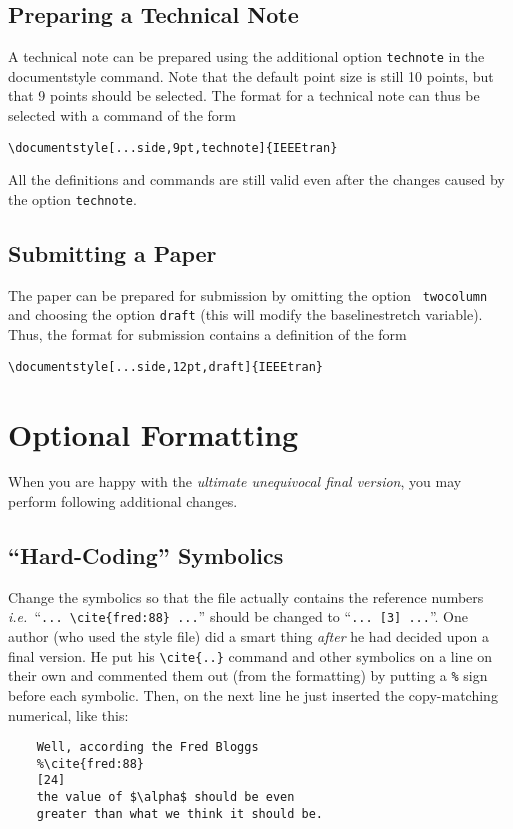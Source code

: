 \subsection{Preparing a Technical Note}
A technical note can be prepared using the additional option
\verb+technote+ in the documentstyle command. Note that the default
point size is still 10 points, but that 9 points should be selected.
The format for a technical note can thus be selected with a command
of the form
\begin{center}
\verb+\documentstyle[...side,9pt,technote]{IEEEtran}+
\end{center}
All the definitions and commands are still valid  even after the
changes caused by the option \verb+technote+.

\subsection{Submitting a Paper}
The paper can be prepared for submission by omitting the option {\tt
twocolumn} and choosing the option {\tt draft} (this will modify the
baselinestretch variable).
Thus, the format for submission contains a definition of the form
\begin{center}
\verb+\documentstyle[...side,12pt,draft]{IEEEtran}+
\end{center}

\section{Optional Formatting}

When you are happy with the {\em ultimate unequivocal final version},
you may perform following additional changes.

\subsection{``Hard-Coding'' Symbolics}
Change the symbolics so that the file actually contains the reference numbers
{\em i.e.\ \/}``\verb+... \cite{fred:88} ...+'' should be changed to
``\verb+... [3] ...+''. One author (who used the style file) did a smart thing
{\em after\/} he had decided upon a final version.  He put his
\verb+\cite{..}+ command and other symbolics on a line on their own
and commented them out (from the formatting) by putting a \verb+%+
sign before each symbolic. Then, on the next line he just inserted the
copy-matching numerical, like this:

\begin{verbatim}
    Well, according the Fred Bloggs
    %\cite{fred:88}
    [24]
    the value of $\alpha$ should be even
    greater than what we think it should be.
\end{verbatim}

